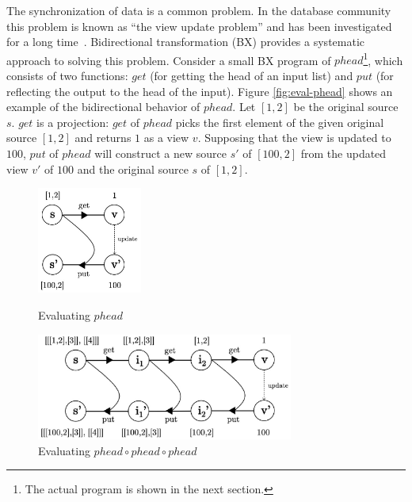 The synchronization of data is a common problem. In the database community this problem is known as ``the view update problem'' and has been investigated for a long time~\cite{Bancilhon:1981:USR:319628.319634}. Bidirectional transformation (BX) provides a systematic approach to solving this problem.
Consider a small BX program of $phead$\footnote{The actual program is shown in the next section.}, which consists of two functions: $get$ (for getting the head of an input list) and $put$ (for reflecting the output to the head of the input). Figure \ref{fig:eval-phead} shows an example of the bidirectional behavior of $phead$.
Let $[1,2]$ be the original source~$s$.
$get$ is a projection: $get$ of $phead$ picks the first element of the given original source $[1,2]$ and returns $1$ as a view $v$.
Supposing that the view is updated to $100$,
$put$ of $phead$ will construct a new source $s'$ of ${[100,2]}$ from the updated view $v'$ of $100$ and the original source $s$ of $[1,2]$.

\begin{figure}[!t]
  \begin{minipage}{0.3\textwidth}
    \centering
    \includegraphics[height=3.5cm]{./fig/fig1.eps}
    \caption{Evaluating $phead$}
    \label{fig:eval-phead}
  \end{minipage}\hfill
  \begin{minipage}{0.7\textwidth}
    \centering
    \includegraphics[height=3.5cm]{./fig/fig2.eps}
    \caption{Evaluating $phead \circ phead \circ phead$}
    \label{fig:eval-comp-phead}
  \end{minipage}
\end{figure}
\vspace*{-5.5mm}


